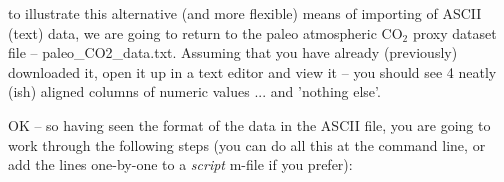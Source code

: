 \documentclass{tufte-book} %
\begin{document}
 to illustrate this alternative (and more flexible) means of importing of ASCII (text) data, we are going to return to the paleo atmospheric CO\(_{2}\) proxy dataset file -- \textsf{paleo\_CO2\_data.txt}. Assuming that you have already (previously) downloaded it,  open it up in a text editor and view it -- you should see 4 neatly (ish) aligned columns of numeric values ... and 'nothing else'.

OK -- so having seen the format of the  data in the ASCII file, you are going to work through the following steps (you can do all this at the command line, or add the lines one-by-one to a \textit{script} m-file if you prefer):
\end{document}

